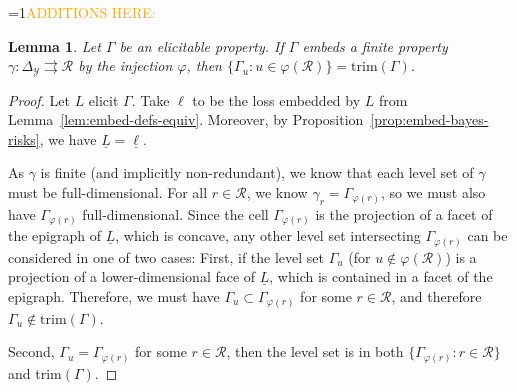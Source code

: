 \documentclass[12pt]{article}
\newcommand{\Comments}{1}
\newcommand{\mynote}[2]{\ifnum\Comments=1\textcolor{#1}{#2}\fi}
\newcommand{\proposedadd}[1]{\mynote{orange}{#1}}
\newcommand{\simplex}{\Delta_\Y}
\newcommand{\R}{\mathcal{R}}
\newcommand{\Y}{\mathcal{Y}}
\newcommand{\risk}[1]{\underline{#1}}
\newcommand{\toto}{\rightrightarrows}
\newcommand{\trim}{\mathrm{trim}}
\newtheorem{lemma}{Lemma}
\begin{document}
\proposedadd{ADDITIONS HERE:}
\begin{lemma}\label{lem:embedded-level-sets-trim}
	Let $\Gamma$ be an elicitable property.
	If $\Gamma$ embeds a finite property $\gamma : \simplex \toto \R$ by the injection $\varphi$, then $\{\Gamma_u : u \in \varphi(\R)\} = \trim(\Gamma)$.
\end{lemma}
\begin{proof}
	Let $L$ elicit $\Gamma$.
	Take $\ell$ to be the loss embedded by $L$ from Lemma~\ref{lem:embed-defs-equiv}.
	Moreover, by Proposition~\ref{prop:embed-bayes-risks}, we have $\risk{L} = \risk{\ell}$.

	As $\gamma$ is finite (and implicitly non-redundant), we know that each level set of $\gamma$ must be full-dimensional. For all $r \in \R$, we know $\gamma_r = \Gamma_{\varphi(r)}$, so we must also have $\Gamma_{\varphi(r)}$ full-dimensional.
	Since the cell $\Gamma_{\varphi(r)}$ is the projection of a facet of the epigraph of $\risk{L}$, which is concave, any other level set intersecting $\Gamma_{\varphi(r)}$ can be considered in one of two cases:
	First, if the level set $\Gamma_u$ (for $u \not \in \varphi(\R)$) is a projection of a lower-dimensional face of $\risk{L}$, which is contained in a facet of the epigraph.
	Therefore, we must have $\Gamma_u \subset \Gamma_{\varphi(r)}$ for some $r \in \R$, and therefore $\Gamma_u \not \in \trim(\Gamma)$.
	
	Second, $\Gamma_u = \Gamma_{\varphi(r)}$ for some $r \in \R$, then the level set is in both $\{\Gamma_{\varphi(r)} : r \in \R\}$ and $\trim(\Gamma)$.
%		
\end{proof}
\end{document}
